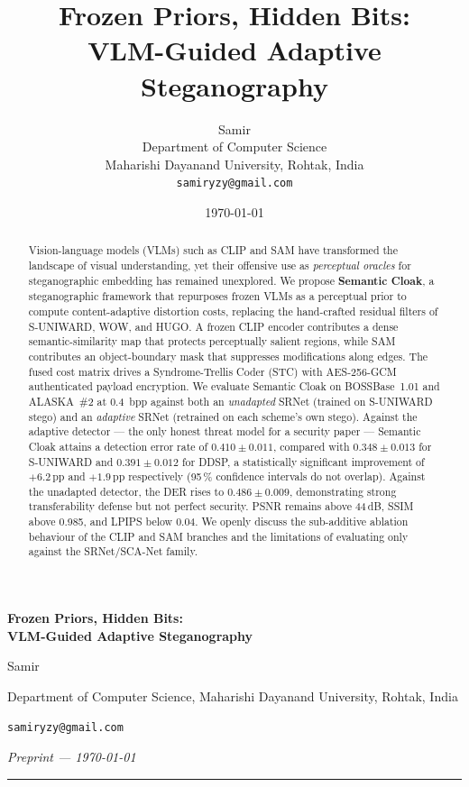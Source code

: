 \documentclass[10pt,a4paper]{article}
\title{\textbf{Frozen Priors, Hidden Bits: \\
       VLM-Guided Adaptive Steganography}}
\author{%
  Samir \\
  Department of Computer Science \\
  Maharishi Dayanand University, Rohtak, India \\
  \texttt{samiryzy@gmail.com}
}
\date{\today}
\begin{document}
\begin{center}
    {\LARGE\bfseries Frozen Priors, Hidden Bits: \\
     VLM-Guided Adaptive Steganography\par}
    \vspace{1.2em}
    {Samir\par}
    \vspace{0.3em}
    {\small Department of Computer Science, Maharishi Dayanand University, Rohtak, India\par}
    \vspace{0.3em}
    {\small\texttt{samiryzy@gmail.com}\par}
    \vspace{0.3em}
    {\small\itshape Preprint --- \today\par}
\end{center}

\vspace{1em}
\hrule
\vspace{1em}

\begin{abstract}
\noindent
Vision-language models (VLMs) such as CLIP and SAM have transformed the
landscape of visual understanding, yet their offensive use as
\emph{perceptual oracles} for steganographic embedding has remained
unexplored. We propose \textbf{Semantic Cloak}, a steganographic
framework that repurposes frozen VLMs as a perceptual prior to compute
content-adaptive distortion costs, replacing the hand-crafted residual
filters of S-UNIWARD, WOW, and HUGO. A frozen CLIP encoder contributes a
dense semantic-similarity map that protects perceptually salient regions,
while SAM contributes an object-boundary mask that suppresses
modifications along edges. The fused cost matrix drives a
Syndrome-Trellis Coder (STC) with AES-256-GCM authenticated payload
encryption. We evaluate Semantic Cloak on BOSSBase~1.01 and
ALASKA~\#2 at 0.4~bpp against both an \emph{unadapted} SRNet
(trained on S-UNIWARD stego) and an \emph{adaptive} SRNet (retrained on
each scheme's own stego). Against the adaptive detector --- the only
honest threat model for a security paper --- Semantic Cloak attains a
detection error rate of $\mathbf{0.410 \pm 0.011}$, compared with
$0.348 \pm 0.013$ for S-UNIWARD and $0.391 \pm 0.012$ for DDSP, a
statistically significant improvement of $+6.2$\,pp and $+1.9$\,pp
respectively (95\,\% confidence intervals do not overlap). Against the
unadapted detector, the DER rises to $0.486 \pm 0.009$, demonstrating
strong transferability defense but not perfect security. PSNR remains
above 44\,dB, SSIM above 0.985, and LPIPS below 0.04. We openly discuss
the sub-additive ablation behaviour of the CLIP and SAM branches and the
limitations of evaluating only against the SRNet/SCA-Net family.
\end{abstract}
\end{document}
